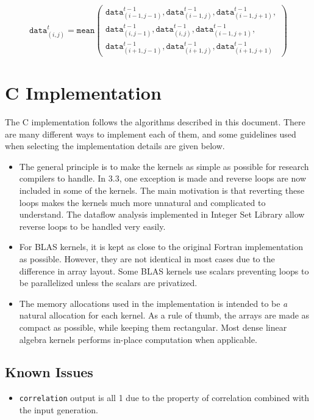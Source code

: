 \documentclass{article}
\begin{document}
\[\mathtt{data}^{t}_{(i,j)} = \mathtt{mean}\left(
\begin{array}{c}
   \mathtt{data}^{t-1}_{(i-1,j-1)}, \mathtt{data}^{t-1}_{(i-1,j)},  \mathtt{data}^{t-1}_{(i-1,j+1)}, \\
   \mathtt{data}^{t-1}_{(i,j-1)}, \mathtt{data}^{t-1}_{(i,j)},  \mathtt{data}^{t-1}_{(i-1,j+1)}, \\
    \mathtt{data}^{t-1}_{(i+1,j-1)}, \mathtt{data}^{t-1}_{(i+1,j)}, \mathtt{data}^{t-1}_{(i+1,j+1)}
\end{array}\right)\]

\section{C Implementation}
The C implementation follows the algorithms described in this document. There are many different ways
to implement each of them, and some guidelines used when selecting the implementation details are given below.


\begin{itemize}
\item The general principle is to make the kernels as simple as possible for
research compilers to handle.  In 3.3, one exception is made and reverse loops
are now included in some of the kernels. The main motivation is that reverting
these loops makes the kernels much more unnatural and complicated to
understand. The dataflow analysis implemented in Integer Set Library allow
reverse loops to be handled very easily. 
\item For BLAS kernels, it is kept as close to the original Fortran implementation as possible. 
However, they are not identical in most cases due to the difference in array layout. Some BLAS
kernels use scalars preventing loops to be parallelized unless the scalars are privatized.
\item The memory allocations used in the implementation is intended to be
\emph{a} natural allocation for each kernel. As a rule of thumb, the
arrays are made as compact as possible, while keeping them rectangular.
Most dense linear algebra kernels performs in-place computation when applicable.
\end{itemize}

\subsection*{Known Issues}
\begin{itemize}
\item {\tt correlation} output is all 1 due to the property of correlation
combined with the input generation.
\end{itemize}
\end{document}
